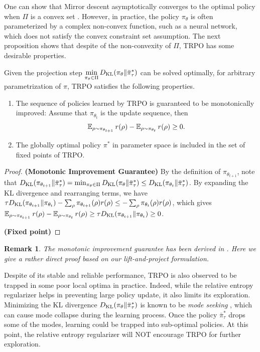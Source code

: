 \documentclass{article} %
\newtheorem{remark}{Remark}
\begin{document}
One can show that Mirror descent asymptotically converges to the optimal policy when $\Pi$ is a convex set \citep{nemirovskii1983problem,beck2003mirror}. However, in practice, the policy $\pi_\theta$ is often parameterized by a complex non-convex function, such as a neural network, which does not satisfy the convex constraint set assumption. 
The next proposition shows that despite of the non-convexity of $\Pi$, TRPO has some desirable properties.
\begin{prop}
\label{prop:monoto_policymirrordescent}
Given the projection step $\min\limits_{\pi_\theta \in \Pi}{D_{\mathrm{KL}}( \pi_\theta \| \bar{\pi}_{\tau}^* )}$ can be solved optimally, for arbitrary parametrization of $\pi$, TRPO satisfies the following properties.
\begin{enumerate}
	\item The sequence of policies learned by TRPO is guaranteed to be monotonically improved:
	Assume that $\pi_{\theta_{t}}$ is the update sequence, then 
	 \begin{equation*}
	\operatorname{\mathbb{E}}_{\rho \sim \pi_{\theta_{t+1}}}{r(\rho)} - \operatorname{\mathbb{E}}_{\rho \sim \pi_{\theta_{t}}}{  r(\rho)} \ge 0.
	\end{equation*}
	\item The globally optimal policy $\pi^*$ in parameter space is included in the set of fixed points of TRPO.
\end{enumerate}
\end{prop}
\begin{proof}
{\bf (Monotonic Improvement Guarantee)} By the definition of $\pi_{\theta_{t+1}}$, note that $D_{\mathrm{KL}}(\pi_{\theta_{t+1}} \| \bar{\pi}_\tau^*)  = \min_{\pi_\theta \in \Pi}{ D_{\mathrm{KL}}(\pi_\theta \| \bar{\pi}_\tau^*)} \leq D_{\mathrm{KL}}(\pi_{\theta_{t}} \| \bar{\pi}_\tau^*)$. By expanding the KL divergence and rearranging terms, we have $ \tau D_{\mathrm{KL}}(\pi_{\theta_{t+1}} \| \pi_{\theta_{t}}) - \sum_{\rho}{ \pi_{\theta_{t+1}}(\rho) r(\rho) } \leq - \sum_{\rho}{ \pi_{\theta_{t}}(\rho) r(\rho) }$, which gives $\operatorname*{\mathbb{E}}_{\rho \sim \pi_{\theta_{t+1}}}{  r(\rho)} - \operatorname*{\mathbb{E}}_{\rho \sim \pi_{\theta_{t}}}{  r(\rho)} \geq \tau D_{\mathrm{KL}}(\pi_{\theta_{t+1}} \| \pi_{\theta_{t}}) \geq 0$.

{\bf (Fixed point)}
\end{proof}
\begin{remark}
	The monotonic improvement guarantee has been derived in \citep{schulman2015trust}. Here we give a rather direct proof based on our lift-and-project formulation.
\end{remark}

Despite of its stable and reliable performance, TRPO is also observed to be trapped in some poor local optima in practice. 
Indeed, while the relative entropy regularizer helps in preventing large policy update, it also limits its exploration.
Minimizing the KL divergence $D_{\mathrm{KL}}(\pi_\theta \| \bar{\pi}_\tau^*) $ is known to be \emph{mode seeking} \citep{kevin2012machine}, which can cause mode collapse during the learning process. Once the policy $\bar{\pi}_\tau^*$ drops some of the modes, learning could be trapped into sub-optimal policies.
At this point, the relative entropy regularizer will NOT encourage TRPO for further exploration.
\end{document}
